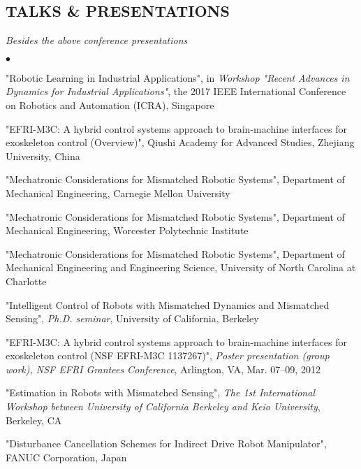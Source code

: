 \documentclass[UTF8,nofonts]{res}
\begin{document}
\begin{resume}
\section{TALKS \& PRESENTATIONS}
{\it Besides the above conference presentations}
\begin{list}{$\bullet$}{\setlength\leftmargin{0in}\setlength\topsep{0in}}
\item {} "Robotic Learning in Industrial Applications", in \emph{Workshop "Recent Advances in Dynamics for Industrial Applications"}, the 2017 IEEE International Conference on Robotics and Automation (ICRA), Singapore
\item {} "EFRI-M3C: A hybrid control systems approach to brain-machine interfaces for exoskeleton control (Overview)", Qiushi Academy for Advanced Studies, Zhejiang University, China
\item {} "Mechatronic Considerations for Mismatched Robotic Systems", Department of Mechanical Engineering, Carnegie Mellon University
\item {} "Mechatronic Considerations for Mismatched Robotic Systems", Department of Mechanical Engineering, Worcester Polytechnic Institute
\item {} "Mechatronic Considerations for Mismatched Robotic Systems", Department of Mechanical Engineering and Engineering Science, University of North Carolina at Charlotte
\item {} "Intelligent Control of Robots with Mismatched Dynamics and Mismatched Sensing", \emph{Ph.D. seminar}, University of California, Berkeley
\item {} "EFRI-M3C: A hybrid control systems approach to brain-machine interfaces for exoskeleton control (NSF EFRI-M3C 1137267)", \emph{Poster presentation (group work), NSF EFRI Grantees Conference}, Arlington, VA, Mar. 07--09, 2012
\item {} "Estimation in Robots with Mismatched Sensing", \emph{The 1st International Workshop between University of California Berkeley and Keio University}, Berkeley, CA
\item {} "Disturbance Cancellation Schemes for Indirect Drive Robot Manipulator", FANUC Corporation, Japan
\end{list}


\end{resume}
\end{document}
